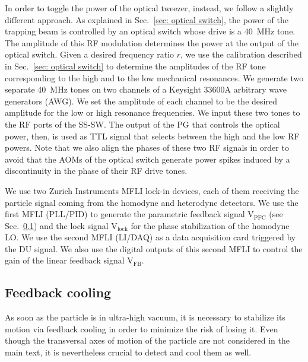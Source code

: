 \documentclass[aps, 
reprint, 
notitlepage,  superscriptaddress, 
onecolumn]{revtex4-1}
\newcommand{\<}{\langle}
\renewcommand{\>}{\rangle}
\begin{document}
In order to toggle the power of the optical tweezer, instead, we follow a slightly different approach. As explained in Sec.~\ref{sec: optical switch}, the power of the trapping beam is controlled by an optical switch whose drive is a \SI{40}{MHz} tone. 
%
The amplitude of this RF modulation determines the power at the output of the optical switch. Given a desired frequency ratio $r$, we use the calibration described in Sec.~\ref{sec: optical switch} to determine the amplitudes of the RF tone corresponding to the high and to the low mechanical resonances. 
%
We generate two separate \SI{40}{MHz} tones on two channels of a Keysight 33600A arbitrary wave generators (AWG). We set the amplitude of each channel to be the desired amplitude for the low or high resonance frequencies. 
%
We input these two tones to the RF ports of the SS-SW. 
%
The output of the PG that controls the optical power, then, is used as TTL signal that selects between the high and the low RF powers. 
%
Note that we also align the phases of these two RF signals in order to avoid that the AOMs of the optical switch generate power spikes induced by a discontinuity in the phase of their RF drive tones. 

We use two Zurich Instruments MFLI lock-in devices, each of them receiving the particle signal coming from the homodyne and heterodyne detectors. We use the first MFLI (PLL/PID) to generate the parametric feedback signal V$_\mathrm{PFC}$ (see Sec.~\ref{sec: feedback cooling}) and the lock signal V$_\mathrm{lock}$ for the phase stabilization of the homodyne LO. We use the second MFLI (LI/DAQ) as a data acquisition card triggered by the DU signal. We also use the digital outputs of this second MFLI to control the gain of the linear feedback signal V$_\mathrm{FB}$. 

\subsection{Feedback cooling}
\label{sec: feedback cooling}

As soon as the particle is in ultra-high vacuum, it is necessary to stabilize its motion via feedback cooling in order to minimize the risk of losing it. 
%
Even though the transversal axes of motion of the particle are not considered in the main text, it is nevertheless crucial to detect and cool them as well. 
\end{document}
